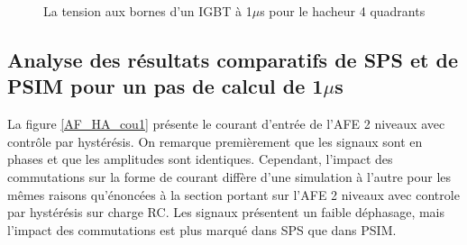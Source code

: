 \begin{figure}[htb]
\caption{La tension aux bornes d'un IGBT à 1$\mu$s pour le hacheur 4 quadrants}
\label{AF_HA_HAV1}
\end{figure}



\clearpage

\subsection{Analyse des résultats comparatifs de SPS et de PSIM pour un pas de calcul de 1$\mu$s}

La figure \ref{AF_HA_cou1} présente le courant d'entrée de l'AFE 2 niveaux avec contrôle par hystérésis. On remarque premièrement que les signaux sont en phases et que les amplitudes sont identiques. Cependant, l'impact des commutations sur la forme de courant diffère d'une simulation à l'autre pour les mêmes raisons qu'énoncées à la section portant sur l'AFE 2 niveaux avec controle par hystérésis sur charge RC. Les signaux présentent un faible déphasage, mais l'impact des commutations est plus marqué dans SPS que dans PSIM.

